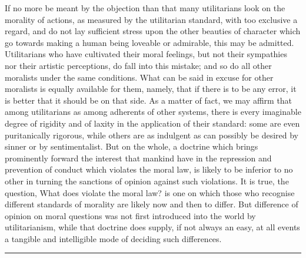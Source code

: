 \documentclass[12pt]{report}
\newcommand*{\xdash}[1][3em]{\rule[0.5ex]{#1}{0.55pt}}
\begin{document}
If no more be meant by the objection than that many utilitarians look on the morality of actions, as measured by the utilitarian standard, with too exclusive a regard, and do not lay sufficient stress upon the other beauties of character which go towards making a human being loveable or admirable, this may be admitted. Utilitarians who have cultivated their moral feelings, but not their sympathies nor their artistic perceptions, do fall into this mistake; and so do all other moralists under the same conditions. What can be said in excuse for other moralists is equally available for them, namely, that if there is to be any error, it is better that it should be on that side. As a matter of fact, we may affirm that among utilitarians as among adherents of other systems, there is every imaginable degree of rigidity and of laxity in the application of their standard: some are even puritanically rigorous, while others are as indulgent as can possibly be desired by sinner or by sentimentalist. But on the whole, a doctrine which brings prominently forward the interest that mankind have in the repression and prevention of conduct which violates the moral law, is likely to be inferior to no other in turning the sanctions of opinion against such violations. It is true, the question, What does violate the moral law? is one on which those who recognise different standards of morality are likely now and then to differ. But difference of opinion on moral questions was not first introduced into the world by utilitarianism, while that doctrine does supply, if not always an easy, at all events a tangible and intelligible mode of deciding such differences.

\begin{center}
\xdash[22em]
\end{center}
\end{document}

